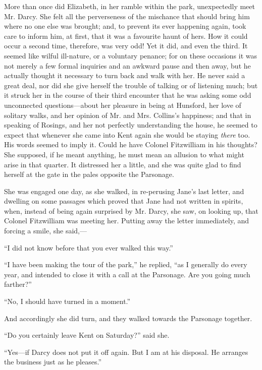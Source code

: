 More than once did Elizabeth, in her ramble within the park, unexpectedly meet Mr. Darcy. She felt all the perverseness of the mischance that should bring him where no one else was brought; and, to prevent its ever happening again, took care to inform him, at first, that it was a favourite haunt of hers. How it could occur a second time, therefore, was very odd! Yet it did, and even the third. It seemed like wilful ill-nature, or a voluntary penance; for on these occasions it was not merely a few formal inquiries and an awkward pause and then away, but he actually thought it necessary to turn back and walk with her. He never said a great deal, nor did she give herself the trouble of talking or of listening much; but it struck her in the course of their third encounter that he was asking some odd unconnected questions---about her pleasure in being at Hunsford, her love of solitary walks, and her opinion of Mr. and Mrs. Collins's happiness; and that in speaking of Rosings, and her not perfectly understanding the house, he seemed to expect that whenever she came into Kent again she would be staying \textit{there} too. His words seemed to imply it. Could he have Colonel Fitzwilliam in his thoughts? She supposed, if he meant anything, he must mean an allusion to what might arise in that quarter. It distressed her a little, and she was quite glad to find herself at the gate in the pales opposite the Parsonage.

She was engaged one day, as she walked, in re-perusing Jane's last letter, and dwelling on some passages which proved that Jane had not written in spirits, when, instead of being again surprised by Mr. Darcy, she saw, on looking up, that Colonel Fitzwilliam was meeting her. Putting away the letter immediately, and forcing a smile, she said,---

``I did not know before that you ever walked this way.''

``I have been making the tour of the park,'' he replied, ``as I generally do every year, and intended to close it with a call at the Parsonage. Are you going much farther?''

``No, I should have turned in a moment.''

And accordingly she did turn, and they walked towards the Parsonage together.

``Do you certainly leave Kent on Saturday?'' said she.

``Yes---if Darcy does not put it off again. But I am at his disposal. He arranges the business just as he pleases.''

